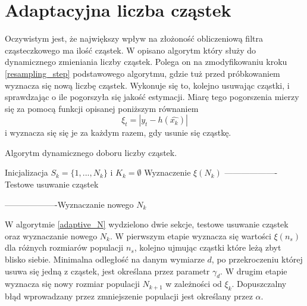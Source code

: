 \section{Adaptacyjna liczba cząstek} \label{adaptive_chapter}
Oczywistym jest, że największy wpływ na złożoność obliczeniową filtra cząsteczkowego ma ilość cząstek. W \cite{adaptive} opisano algorytm który służy do dynamicznego zmieniania liczby cząstek. Polega on na zmodyfikowaniu kroku \ref{resampling_step} podstawowego algorytmu, gdzie tuż przed próbkowaniem wyznacza się nową liczbę cząstek. Wykonuje się to, kolejno usuwając cząstki, i sprawdzając o ile pogorszyła się jakość estymacji. Miarę tego pogorszenia mierzy się za pomocą funkcji opisanej poniższym równaniem
\begin{equation}\label{ceana_pogorszenia}
	\xi_t = |y_t-h(\hat{x_k})|
\end{equation}
i wyznacza się się je za każdym razem, gdy usunie się cząstkę.

\begin{algorithm}[H]
	\SetAlgoLined
	\DontPrintSemicolon
	\caption{Algorytm dynamicznego doboru liczby cząstek.} \label{adaptive_N}
	Inicjalizacja $S_k=\{1,...,N_k\}$ i $K_k=\emptyset$\;
	Wyznaczenie $\xi(N_k)$\;
	-------------------Testowe usuwanie cząstek\;

	-------------------Wyznaczanie nowego $N_k$\;
	
\end{algorithm}
W algorytmie \ref{adaptive_N} wydzielono dwie sekcje, testowe usuwanie cząstek oraz wyznaczanie nowego $N_k$. W pierwszym etapie wyznacza się wartości $\xi(n_s)$ dla różnych rozmiarów populacji $n_s$, kolejno ujmując cząstki które leżą zbyt blisko siebie. Minimalna odległość na danym wymiarze $d$, po przekroczeniu której usuwa się jedną z cząstek, jest określana przez parametr $\gamma_d$. W drugim etapie wyznacza się nowy rozmiar populacji $N_{k+1}$ w zależności od $\xi_k$. Dopuszczalny błąd wprowadzany przez zmniejszenie populacji jest określany przez $\alpha$.

